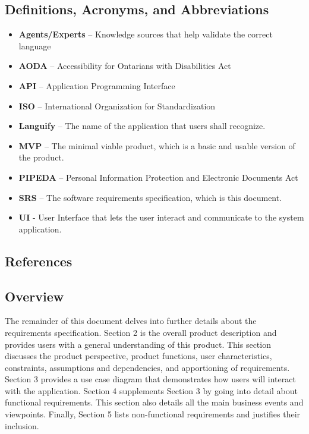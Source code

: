 \subsection{Definitions, Acronyms, and Abbreviations}
\label{sub:definitions_acronyms_and_abbreviations}
\begin{itemize}
	\item \textbf{Agents/Experts} – Knowledge sources that help validate the correct language
	\item \textbf{AODA} – Accessibility for Ontarians with Disabilities Act
	\item \textbf{API} – Application Programming Interface
	\item \textbf{ISO} – International Organization for Standardization
	\item \textbf{Languify} – The name of the application that users shall recognize.
	\item \textbf{MVP} – The minimal viable product, which is a basic and usable version of the product. 
	\item \textbf{PIPEDA} – Personal Information Protection and Electronic Documents Act
	\item \textbf{SRS} – The software requirements specification, which is this document.
	\item \textbf{UI} - User Interface that lets the user interact and communicate to the system application.
\end{itemize}


\subsection{References}
\label{sub:references}
\printbibliography[heading=none]
% 
% 


\subsection{Overview}
\label{sub:overview}
The remainder of this document delves into further details about the requirements specification. Section 2 is the overall product description and provides users with a general understanding of this product. This section discusses the product perspective, product functions, user characteristics, constraints, assumptions and dependencies, and apportioning of requirements. Section 3 provides a use case diagram that demonstrates how users will interact with the application. Section 4 supplements Section 3 by going into detail about functional requirements. This section also details all the main business events and viewpoints. Finally, Section 5 lists non-functional requirements and justifies their inclusion.

